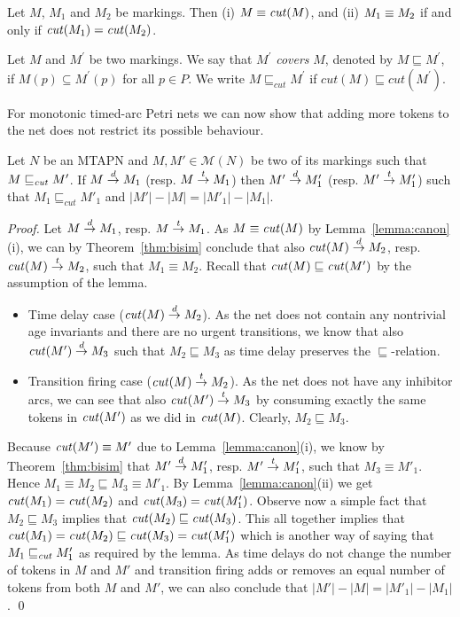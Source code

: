 \begin{lemma}
\label{lemma:canon}
Let $M$, $M_1$ and $M_2$ be markings. Then
(i) $M \equiv \mathit{cut}(M)$, and (ii)
$M_1 \equiv M_2$ if and only if $\mathit{cut}(M_1)=\mathit{cut}(M_2)$.
\end{lemma}

Let $M$ and $M^\prime$ be two markings. We say that $M^\prime$ \emph{covers} 
$M$, denoted by $M \sqsubseteq M^\prime$, if $M(p) \subseteq M^\prime(p)$ 
for all $p \in P$. We write $M \sqsubseteq_{cut} M^\prime$ 
if $cut(M) \sqsubseteq cut(M^\prime)$.

For monotonic timed-arc Petri nets we can now show that adding more tokens
to the net does not restrict its possible behaviour. 

\begin{lemma}
\label{lem:mono}
Let $N$ be an MTAPN and $M,M' \in \mathcal{M}(N)$
be two of its markings such that $M \sqsubseteq_{\mathit{cut}} M'$. 
If $M \stackrel{d}{\rightarrow} M_1$ (resp. $M \stackrel{t}{\rightarrow} M_1$) then 
$M' \stackrel{d}{\rightarrow} M'_1$ (resp. $M' \stackrel{t}{\rightarrow} M'_1$) such that 
$M_1 \sqsubseteq_{cut} M'_1$ and 
$|M'|-|M|=|M'_1|-|M_1|$.
\end{lemma}
\begin{proof}
Let $M \stackrel{d}{\rightarrow} M_1$, resp. $M \stackrel{t}{\rightarrow} M_1$.
As $M \equiv \mathit{cut}(M)$ by Lemma~\ref{lemma:canon}(i),
we can by Theorem~\ref{thm:bisim} conclude that also $\mathit{cut}(M) \stackrel{d}{\rightarrow} M_2$,
resp. $\mathit{cut}(M) \stackrel{t}{\rightarrow} M_2$,
such that $M_1 \equiv M_2$. Recall that $\mathit{cut}(M) \sqsubseteq \mathit{cut}(M')$
by the assumption of the lemma.
\begin{itemize}
\item Time delay case ($\mathit{cut}(M) \stackrel{d}{\rightarrow} M_2$).
As the net does not contain any nontrivial age invariants
and there are no urgent transitions,
we know that also $\mathit{cut}(M') \stackrel{d}{\rightarrow} M_3$ such that
$M_2 \sqsubseteq M_3$ as time delay preserves the $\sqsubseteq$-relation.
\item Transition firing case ($\mathit{cut}(M) \stackrel{t}{\rightarrow} M_2$).
As the net does not have any inhibitor arcs,
we can see that also $\mathit{cut}(M') \stackrel{t}{\rightarrow} M_3$ by consuming
exactly the same tokens in $\mathit{cut}(M')$ as we did in $\mathit{cut}(M)$.
Clearly, $M_2 \sqsubseteq M_3$.
\end{itemize}
Because $\mathit{cut}(M') \equiv M'$ due to Lemma~\ref{lemma:canon}(i),
we know by Theorem~\ref{thm:bisim}
that $M' \stackrel{d}{\rightarrow} M'_1$, resp. $M' \stackrel{t}{\rightarrow} M'_1$, such that $M_3 \equiv M'_1$.
Hence $M_1 \equiv M_2 \sqsubseteq M_3 \equiv M'_1$.
By Lemma~\ref{lemma:canon}(ii) we get
$\mathit{cut}(M_1)=\mathit{cut}(M_2)$ and $\mathit{cut}(M_3)=\mathit{cut}(M'_1)$.
Observe now a simple fact that $M_2 \sqsubseteq M_3$ implies that
$\mathit{cut}(M_2) \sqsubseteq \mathit{cut}(M_3)$.
This all together implies that $\mathit{cut}(M_1)=\mathit{cut}(M_2) \sqsubseteq
\mathit{cut}(M_3) = \mathit{cut}(M'_1)$ which is another way of saying that
$M_1 \sqsubseteq_{\mathit{cut}} M'_1$ as required by the lemma.
As time delays do not change the number of
tokens in $M$ and $M'$ and transition firing adds or removes an
equal number of tokens from both $M$ and $M'$,
we can also conclude that $|M'|-|M|=|M'_1|-|M_1|$.
\qed
\end{proof}



